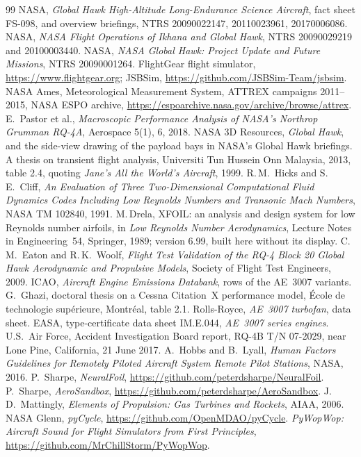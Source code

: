 \documentclass[10pt,a4paper,twocolumn]{article}
\begin{document}
\begin{thebibliography}{99}\small
{} NASA, \emph{Global Hawk High-Altitude Long-Endurance Science Aircraft}, fact sheet FS-098, and overview briefings, NTRS 20090022147, 20110023961, 20170006086.
 NASA, \emph{NASA Flight Operations of Ikhana and Global Hawk}, NTRS 20090029219 and 20100003440.
 NASA, \emph{NASA Global Hawk: Project Update and Future Missions}, NTRS 20090001264.
 FlightGear flight simulator, \url{https://www.flightgear.org}; JSBSim, \url{https://github.com/JSBSim-Team/jsbsim}.
 NASA Ames, Meteorological Measurement System, ATTREX campaigns 2011--2015, NASA ESPO archive, \url{https://espoarchive.nasa.gov/archive/browse/attrex}.
 E.\ Pastor et al., \emph{Macroscopic Performance Analysis of NASA's Northrop Grumman RQ-4A}, Aerospace 5(1), 6, 2018.
 NASA 3D Resources, \emph{Global Hawk}, and the side-view drawing of the payload bays in NASA's Global Hawk briefings.
 A thesis on transient flight analysis, Universiti Tun Hussein Onn Malaysia, 2013, table 2.4, quoting \emph{Jane's All the World's Aircraft}, 1999.
 R.\,M.\ Hicks and S.\,E.\ Cliff, \emph{An Evaluation of Three Two-Dimensional Computational Fluid Dynamics Codes Including Low Reynolds Numbers and Transonic Mach Numbers}, NASA TM 102840, 1991.
 M.\,Drela, XFOIL: an analysis and design system for low Reynolds number airfoils, in \emph{Low Reynolds Number Aerodynamics}, Lecture Notes in
Engineering~54, Springer, 1989; version 6.99, built here without its display.
 C.\,M.\ Eaton and R.\,K.\ Woolf, \emph{Flight Test Validation of the RQ-4 Block 20 Global Hawk Aerodynamic and Propulsive Models}, Society of Flight Test Engineers, 2009.
 ICAO, \emph{Aircraft Engine Emissions Databank}, rows of the AE~3007 variants.
 G.\ Ghazi, doctoral thesis on a Cessna Citation~X performance model, \'Ecole de technologie sup\'erieure, Montr\'eal, table 2.1.
 Rolls-Royce, \emph{AE~3007 turbofan}, data sheet.
 EASA, type-certificate data sheet IM.E.044, \emph{AE~3007 series engines}.
 U.S.\ Air Force, Accident Investigation Board report, RQ-4B T/N 07-2029, near Lone Pine, California, 21 June 2017.
 A.\ Hobbs and B.\ Lyall, \emph{Human Factors Guidelines for Remotely Piloted Aircraft System Remote Pilot Stations}, NASA, 2016.
 P.\ Sharpe, \emph{NeuralFoil}, \url{https://github.com/peterdsharpe/NeuralFoil}.
 P.\ Sharpe, \emph{AeroSandbox}, \url{https://github.com/peterdsharpe/AeroSandbox}.
 J.\,D.\ Mattingly, \emph{Elements of Propulsion: Gas Turbines and Rockets}, AIAA, 2006.
 NASA Glenn, \emph{pyCycle}, \url{https://github.com/OpenMDAO/pyCycle}.
 \emph{PyWopWop: Aircraft Sound for Flight Simulators from First Principles}, \url{https://github.com/MrChillStorm/PyWopWop}.
\end{thebibliography}
\end{document}

